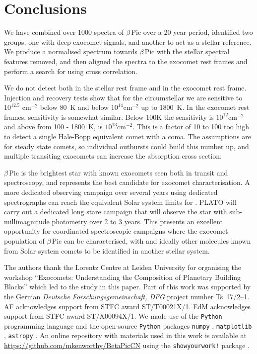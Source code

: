 \documentclass{aa}
\newcommand{\bp}{$\beta$\,Pic}
\begin{document}
\section{Conclusions}\label{sec:conclusion}

We have combined over 1000 spectra of \bp{} over a 20 year period, identified two groups, one with deep exocomet signals, and another to act as a stellar reference.
%
We produce a normalised spectrum towards \bp{} with the stellar spectral features removed, and then aligned the spectra to the exocomet rest frames and perform a search for  using cross correlation.

We do not detect  both in the stellar rest frame and in the exocomet rest frame.
%
Injection and recovery tests show that for the circumstellar  we are sensitive to $10^{12.5}$ cm$^{-2}$ below 80~K and below $10^{14}$cm$^{-2}$ up to 1800~K.
%
In the exocomet rest frames, sensitivity is somewhat similar.
%
Below 100K the sensitivity is $10^{12}$cm$^{-2}$ and above from 100 - 1800~K, is $10^{13}$cm$^{-2}$.
%
This is a factor of 10 to 100 too high to detect a single Hale-Bopp equivalent comet with a  coma.
%
The assumptions are for steady state comets, so individual outbursts could build this number up, and multiple transiting exocomets can increase the absorption cross section.

\bp{} is the brightest star with known exocomets seen both in transit and spectroscopy, and represents the best candidate for exocomet characterisation.
%
A more dedicated observing campaign over several years using dedicated spectrographs can reach the equivalent Solar system limits for .
%
PLATO will carry out a dedicated long stare campaign that will observe the star with sub-millimagnitude photometry over 2 to 3 years.
%
This presents an excellent opportunity for coordinated spectroscopic campaigns where the exocomet population of \bp{} can be characterised, with  and ideally other molecules known from Solar system comets to be identified in another stellar system.

\begin{acknowledgements}

The authors thank the Lorentz Centre at Leiden University for organising the workshop ``Exocomets: Understanding the Composition of Planetary Building Blocks'' which led to the study in this paper. 
%
Part of this work was supported by the German \emph{Deut\-sche For\-schungs\-ge\-mein\-schaft, DFG\/} project number Ts~17/2--1.
%
AF acknowledges support from STFC award ST/T00021X/1.
%
EdM acknowledges support from STFC award ST/X00094X/1.
%
We made use of the {\tt Python} programming language \citep{rossum1995} and the open-source {\tt Python} packages {\tt numpy} \citep{walt2011}, {\tt matplotlib} \citep{hunter2007}, {\tt astropy} \citep{astropy2013}.
%      
An online repository with materials used in this work is available at \url{https://github.com/mkenworthy/BetaPicCN} using the {\tt showyourwork!} package \citep{Luger2021}.

\end{acknowledgements}
\end{document}
